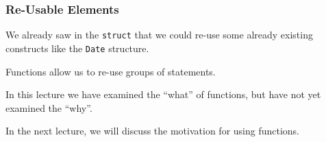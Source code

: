\begin{frame}[fragile]
\frametitle{Re-Usable Elements}
We already saw in the \texttt{struct} that we could re-use some already existing constructs like the \texttt{Date} structure.

Functions allow us to re-use groups of statements.

In this lecture we have examined the ``what'' of functions, but have not yet examined the ``why''.

In the next lecture, we will discuss the motivation for using functions.


\end{frame}




